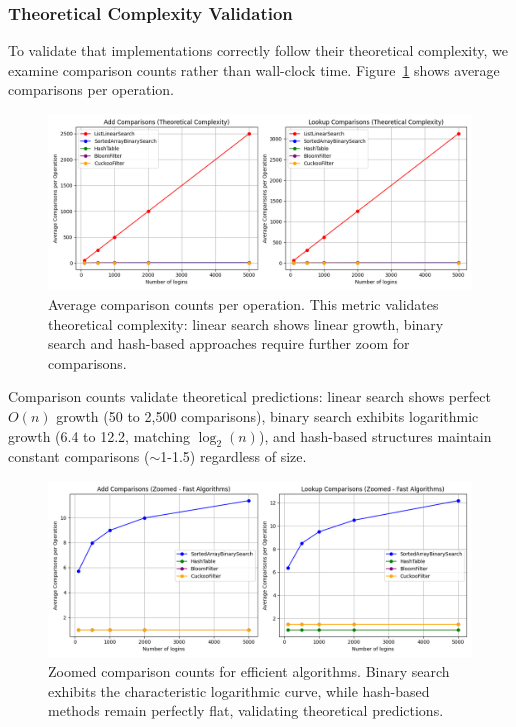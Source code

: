 \subsubsection{Theoretical Complexity Validation}

To validate that implementations correctly follow their theoretical complexity, we examine comparison counts rather than wall-clock time. Figure~\ref{fig:comparisons_full} shows average comparisons per operation.

\begin{figure}[h]
    \centering
    \includegraphics[width=\textwidth]{../img/login_checker_comparisons.png}
    \caption{Average comparison counts per operation. This metric validates theoretical complexity: linear search shows linear growth, binary search and hash-based approaches require further zoom for comparisons.}
    \label{fig:comparisons_full}
\end{figure}

Comparison counts validate theoretical predictions: linear search shows perfect $O(n)$ growth (50 to 2,500 comparisons), binary search exhibits logarithmic growth (6.4 to 12.2, matching $\log_2(n)$), and hash-based structures maintain constant comparisons ($\sim$1-1.5) regardless of size.

\begin{figure}[h]
    \centering
    \includegraphics[width=\textwidth]{../img/login_checker_comparisons_zoomed.png}
    \caption{Zoomed comparison counts for efficient algorithms. Binary search exhibits the characteristic logarithmic curve, while hash-based methods remain perfectly flat, validating theoretical predictions.}
    \label{fig:comparisons_zoomed}
\end{figure}

